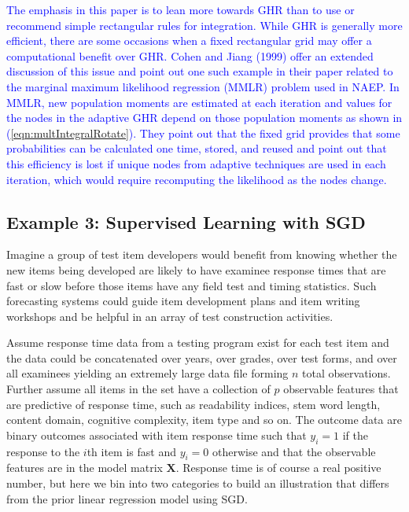 \documentclass[12pt]{article}
\begin{document}
\textcolor{blue}{The emphasis in this paper is to lean more towards GHR than to use or recommend simple rectangular rules for integration. While GHR is generally more efficient, there are some occasions when a fixed rectangular grid may offer a computational benefit over GHR. Cohen and Jiang (1999) offer an extended discussion of this issue and point out one such example in their paper related to the marginal maximum likelihood regression (MMLR) problem used in NAEP. In MMLR, new population moments are estimated at each iteration and values for the nodes in the adaptive GHR depend on those population moments as shown in (\ref{eqn:multIntegralRotate}). They point out that the fixed grid provides that some probabilities can be calculated one time, stored, and reused and point out that this efficiency is lost if unique nodes from adaptive techniques are used in each iteration, which would require recomputing the likelihood as the nodes change.} \nocite{cohen:mml}

\subsection*{Example 3: Supervised Learning with SGD}

Imagine a group of test item developers would benefit from knowing whether the new items being developed are likely to have examinee response times that are fast or slow before those items have any field test and timing statistics. Such forecasting systems could guide item development plans and item writing workshops and be helpful in an array of test construction activities. 

Assume response time data from a testing program exist for each test item and the data could be concatenated over years, over grades, over test forms, and over all examinees yielding an extremely large data file forming $n$ total observations. Further assume all items in the set have a collection of $p$ observable features that are predictive of response time, such as readability indices, stem word length, content domain, cognitive complexity, item type and so on. The outcome data are binary outcomes associated with item response time such that $y_{i} = 1$ if the response to the $i$th item is fast and $y_{i}=0$ otherwise and that the observable features are in the model matrix $\bm{X}$. Response time is of course a real positive number, but here we bin into two categories to build an illustration that differs from the prior linear regression model using SGD.   
\end{document}
